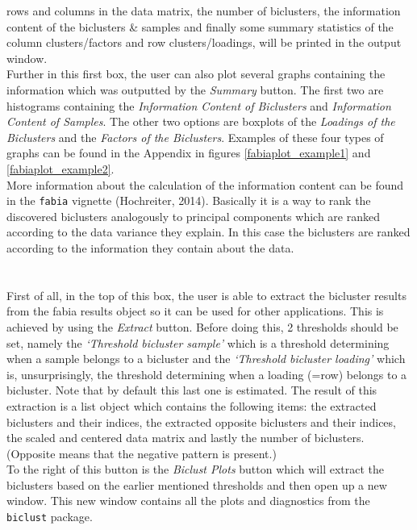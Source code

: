 \documentclass[a4paper]{article}\usepackage[]{graphicx}\usepackage[]{color}
\begin{document}
rows and columns in the data matrix, the number of biclusters, the information
content of the biclusters \& samples and finally some summary statistics of the
column clusters/factors and row clusters/loadings, will be printed in the output
window.\\
Further in this first box, the user can also plot several graphs containing the
information which was outputted by the {\it Summary} button. The first two are
histograms containing the {\it Information Content of Biclusters} and {\it
Information Content of Samples}. The other two options are boxplots of the {\it
Loadings of the Biclusters} and the {\it Factors of the Biclusters}. Examples of
these four types of graphs can be found in the Appendix in figures
\ref{fabiaplot_example1} and \ref{fabiaplot_example2}.\\
More information about the calculation of the information content can be found
in the \verb|fabia| vignette (Hochreiter, 2014). Basically it is a way to rank
the discovered biclusters analogously to principal components which are ranked
according to the data variance they explain. In this case the biclusters are
ranked according to the information they contain about the data.
\\ \\
\\
\noindent First of all, in the top of this box, the user is able to extract the
bicluster results from the fabia results object so it can be used for other
applications. This is achieved by using the {\it Extract} button. Before doing
this, 2 thresholds should be set, namely the {\it `Threshold bicluster sample'}
which is a threshold determining when a sample belongs to a bicluster and the {\it `Threshold bicluster loading'} which is, unsurprisingly,
the threshold determining when a loading (=row) belongs to a bicluster. Note
that by default this last one is estimated. The result of this extraction is a
list object which contains the following items: the extracted biclusters and
their indices, the extracted opposite biclusters and their indices, the scaled
and centered data matrix and lastly the number of biclusters. (Opposite means
that the negative pattern is present.)\\
To the right of this button is the {\it Biclust Plots} button which will extract
the biclusters based on the earlier mentioned thresholds and then open up a new
window. This new window contains all the plots and diagnostics from the
\verb|biclust| package.
\\ \\
\end{document}
